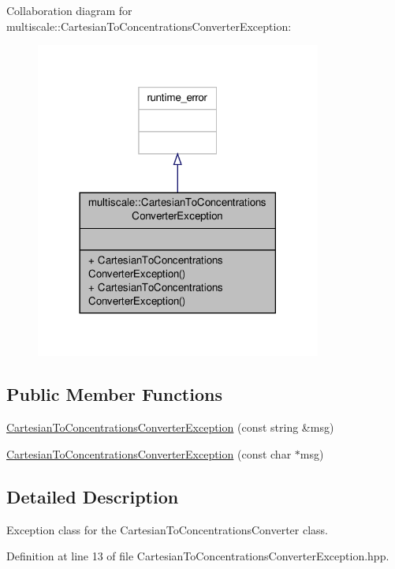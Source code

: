 Collaboration diagram for multiscale\-:\-:Cartesian\-To\-Concentrations\-Converter\-Exception\-:\nopagebreak
\begin{figure}[H]
\begin{center}
\leavevmode
\includegraphics[width=266pt]{classmultiscale_1_1CartesianToConcentrationsConverterException__coll__graph}
\end{center}
\end{figure}
\subsection*{Public Member Functions}
\begin{DoxyCompactItemize}
\item 
\hyperlink{classmultiscale_1_1CartesianToConcentrationsConverterException_aa5f13cfa28fc44eda6bc2c53382e6749}{Cartesian\-To\-Concentrations\-Converter\-Exception} (const string \&msg)
\item 
\hyperlink{classmultiscale_1_1CartesianToConcentrationsConverterException_a91a1cee8ddfefb30eb0d01ff2afbd3e7}{Cartesian\-To\-Concentrations\-Converter\-Exception} (const char $\ast$msg)
\end{DoxyCompactItemize}


\subsection{Detailed Description}
Exception class for the Cartesian\-To\-Concentrations\-Converter class. 

Definition at line 13 of file Cartesian\-To\-Concentrations\-Converter\-Exception.\-hpp.



